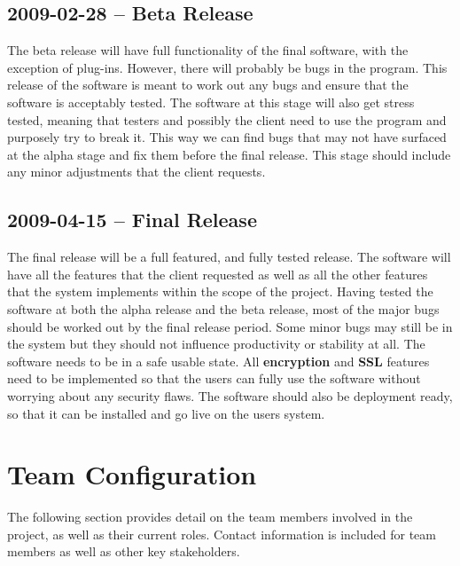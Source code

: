 \documentclass[letterpaper,12pt]{report}
\begin{document}
\section{2009-02-28 – Beta Release}
\hspace{1cm}The beta release will have full functionality of the final software, with the exception of plug-ins. However, there will probably be bugs in the program. This release of the software is meant to work out any bugs and ensure that the software is acceptably tested. The software at this stage will also get stress tested, meaning that testers and possibly the client need to use the program and purposely try to break it. This way we can find bugs that may not have surfaced at the alpha stage and fix them before the final release. This stage should include any minor adjustments that the client requests. 
\section{2009-04-15 – Final Release}
\hspace{1cm}The final release will be a full featured, and fully tested release. The software will have all the features that the client requested as well as all the other features that the system implements within the scope of the project. Having tested the software at both the alpha release and the beta release, most of the major bugs should be worked out by the final release period. Some minor bugs may still be in the system but they should not influence productivity or stability at all. The software needs to be in a safe usable state. All \textbf{encryption} and \textbf{SSL} features need to be implemented so that the users can fully use the software without worrying about any security flaws. The software should also be deployment ready, so that it can be installed and go live on the users system. 

\chapter{Team Configuration}
	The following section provides detail on the team members involved in the project, as well as their current roles. Contact information is included for team members as well as other key stakeholders.
\end{document}
